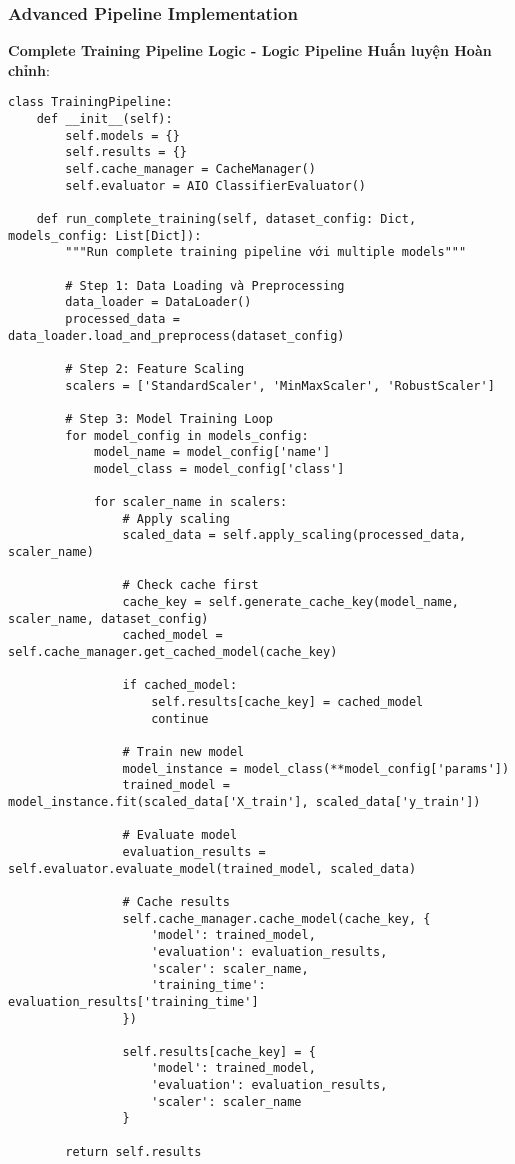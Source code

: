 \subsubsection{Advanced Pipeline Implementation}

\textbf{Complete Training Pipeline Logic - Logic Pipeline Huấn luyện Hoàn chỉnh}:

\begin{verbatim}
class TrainingPipeline:
    def __init__(self):
        self.models = {}
        self.results = {}
        self.cache_manager = CacheManager()
        self.evaluator = AIO ClassifierEvaluator()
        
    def run_complete_training(self, dataset_config: Dict, models_config: List[Dict]):
        """Run complete training pipeline với multiple models"""
        
        # Step 1: Data Loading và Preprocessing
        data_loader = DataLoader()
        processed_data = data_loader.load_and_preprocess(dataset_config)
        
        # Step 2: Feature Scaling
        scalers = ['StandardScaler', 'MinMaxScaler', 'RobustScaler']
        
        # Step 3: Model Training Loop
        for model_config in models_config:
            model_name = model_config['name']
            model_class = model_config['class']
            
            for scaler_name in scalers:
                # Apply scaling
                scaled_data = self.apply_scaling(processed_data, scaler_name)
                
                # Check cache first
                cache_key = self.generate_cache_key(model_name, scaler_name, dataset_config)
                cached_model = self.cache_manager.get_cached_model(cache_key)
                
                if cached_model:
                    self.results[cache_key] = cached_model
                    continue
                
                # Train new model
                model_instance = model_class(**model_config['params'])
                trained_model = model_instance.fit(scaled_data['X_train'], scaled_data['y_train'])
                
                # Evaluate model
                evaluation_results = self.evaluator.evaluate_model(trained_model, scaled_data)
                
                # Cache results
                self.cache_manager.cache_model(cache_key, {
                    'model': trained_model,
                    'evaluation': evaluation_results,
                    'scaler': scaler_name,
                    'training_time': evaluation_results['training_time']
                })
                
                self.results[cache_key] = {
                    'model': trained_model,
                    'evaluation': evaluation_results,
                    'scaler': scaler_name
                }
                
        return self.results
\end{verbatim}


